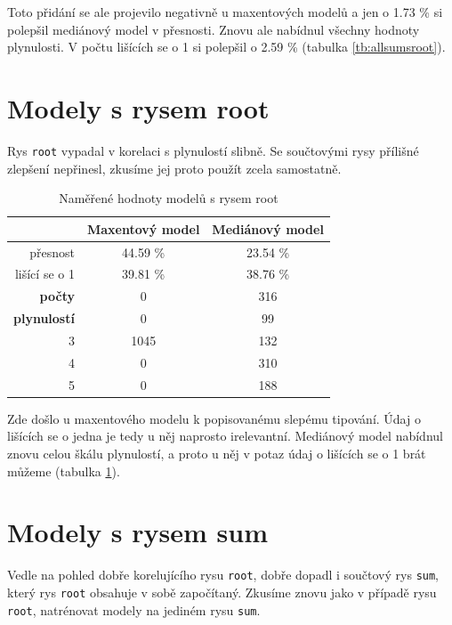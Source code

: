\documentclass[12pt,a4paper]{report}
\begin{document}
Toto přidání se ale projevilo negativně u maxentových modelů a jen o 1.73 \% si polepšil mediánový model v přesnosti. Znovu ale nabídnul všechny hodnoty plynulosti. V počtu lišících se o 1 si polepšil o 2.59 \% (tabulka \ref{tb:allsumsroot}).


\section{Modely s rysem root}
Rys \texttt{root} vypadal v korelaci s plynulostí slibně. Se součtovými rysy přílišné zlepšení nepřinesl, zkusíme jej proto použít zcela samostatně.

\begin{table}[!htbp]
\begin{center}
\begin{tabular}{|r|c|c|}
\hline
 & \textbf{Maxentový model} & \textbf{Mediánový model} \\
 \hline
     přesnost & 44.59 \%  & 23.54 \%  \\
\hline
lišící se o 1 & 39.81 \% & 38.76 \%  \\
\hline
     \textbf{počty} \quad 1 & \color{red}0   & \color{OliveGreen}316   \\
\textbf{plynulostí} \quad 2 & \color{red}0 & \color{OliveGreen}99   \\
                          3 & 1045 & \color{OliveGreen}132 \\
                          4 & \color{red}0   & \color{OliveGreen}310 \\
                          5 & \color{red}0   & \color{OliveGreen}188  \\
\hline
\end{tabular}
\caption{Naměřené hodnoty modelů s rysem root}\label{tb:root}
\end{center}
\end{table}

Zde došlo u maxentového modelu k popisovanému slepému tipování. Údaj o lišících se o jedna je tedy u něj naprosto irelevantní. Mediánový model nabídnul znovu celou škálu plynulostí, a proto u něj v potaz údaj o lišících se o 1 brát můžeme (tabulka \ref{tb:root}).

\section{Modely s rysem sum}
Vedle na pohled dobře korelujícího rysu \texttt{root}, dobře dopadl i součtový rys \texttt{sum}, který rys \texttt{root} obsahuje v sobě započítaný. Zkusíme znovu jako v případě rysu \texttt{root}, natrénovat modely na jediném rysu \texttt{sum}.
\end{document}
